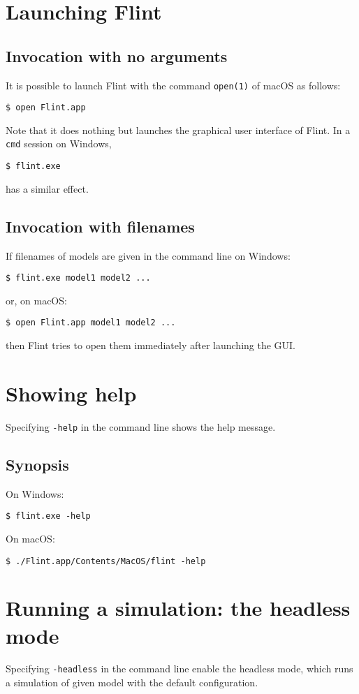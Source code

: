 \documentclass[a4paper,10pt]{report}
\begin{document}
\section{Launching Flint}

\subsection{Invocation with no arguments}
It is possible to launch Flint with the command {\tt open(1)} of macOS as follows:
\begin{verbatim}
$ open Flint.app
\end{verbatim}
Note that it does nothing but launches the graphical user interface of Flint.
In a {\tt cmd} session on Windows,
\begin{verbatim}
$ flint.exe
\end{verbatim}
has a similar effect.

\subsection{Invocation with filenames}
If filenames of models are given in the command line on Windows:
\begin{verbatim}
$ flint.exe model1 model2 ...
\end{verbatim}
or, on macOS:
\begin{verbatim}
$ open Flint.app model1 model2 ...
\end{verbatim}
then Flint tries to open them immediately after launching the GUI.

\section{Showing help}
Specifying {\tt -help} in the command line shows the help message.

\subsection{Synopsis}
On Windows:
\begin{verbatim}
$ flint.exe -help
\end{verbatim}
On macOS:
\begin{verbatim}
$ ./Flint.app/Contents/MacOS/flint -help
\end{verbatim}

\section{Running a simulation: the headless mode}
Specifying {\tt -headless} in the command line enable the headless mode, which
runs a simulation of given model with the default configuration.
\end{document}
